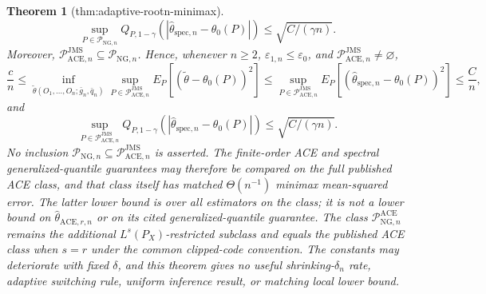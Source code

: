 \documentclass{article}
\newtheorem{theorem}{Theorem}
\begin{document}
\begin{theorem}[thm:adaptive-rootn-minimax]
\[
 \sup_{P\in\mathcal P_{\mathrm{NG},n}}
 Q_{P,1-\gamma}(|\widehat\theta_{\mathrm{spec},n}-\theta_0(P)|)
 \le\sqrt{C/(\gamma n)}.
\]
Moreover, \(\mathcal P_{\mathrm{ACE},n}^{\mathrm{JMS}}\subseteq\mathcal P_{\mathrm{NG},n}\). Hence, whenever \(n\ge2\), \(\varepsilon_{1,n}\le\varepsilon_0\), and \(\mathcal P_{\mathrm{ACE},n}^{\mathrm{JMS}}\neq\varnothing\),
\[
 \frac cn
 \le
 \inf_{\widetilde\theta(O_1,\ldots,O_n;\bar g_n,\bar q_n)}
 \sup_{P\in\mathcal P_{\mathrm{ACE},n}^{\mathrm{JMS}}}
 E_P[(\widetilde\theta-\theta_0(P))^2]
 \le
 \sup_{P\in\mathcal P_{\mathrm{ACE},n}^{\mathrm{JMS}}}
 E_P[(\widehat\theta_{\mathrm{spec},n}-\theta_0(P))^2]
 \le\frac Cn,
\]
and
\[
 \sup_{P\in\mathcal P_{\mathrm{ACE},n}^{\mathrm{JMS}}}
 Q_{P,1-\gamma}(|\widehat\theta_{\mathrm{spec},n}-\theta_0(P)|)
 \le\sqrt{C/(\gamma n)}.
\]
No inclusion \(\mathcal P_{\mathrm{NG},n}\subseteq\mathcal P_{\mathrm{ACE},n}^{\mathrm{JMS}}\) is asserted. The finite-order ACE and spectral generalized-quantile guarantees may therefore be compared on the full published ACE class, and that class itself has matched \(\Theta(n^{-1})\) minimax mean-squared error. The latter lower bound is over all estimators on the class; it is not a lower bound on \(\widehat\theta_{\mathrm{ACE},r,n}\) or on its cited generalized-quantile guarantee. The class \(\mathcal P_{\mathrm{NG},n}^{\mathrm{ACE}}\) remains the additional \(L^s(P_X)\)-restricted subclass and equals the published ACE class when \(s=r\) under the common clipped-code convention. The constants may deteriorate with fixed \(\delta\), and this theorem gives no useful shrinking-\(\delta_n\) rate, adaptive switching rule, uniform inference result, or matching local lower bound.
\end{theorem}
\end{document}
